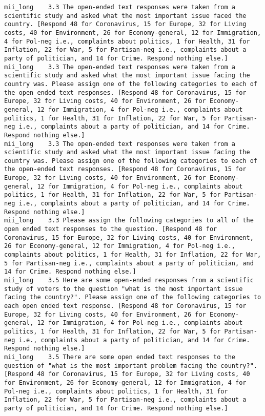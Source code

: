 \begin{lstlisting}[label=lst:promptvariants]
mii_long	3.3	The open-ended text responses were taken from a scientific study and asked what the most important issue faced the country. [Respond 48 for Coronavirus, 15 for Europe, 32 for Living costs, 40 for Environment, 26 for Economy-general, 12 for Immigration, 4 for Pol-neg i.e., complaints about politics, 1 for Health, 31 for Inflation, 22 for War, 5 for Partisan-neg i.e., complaints about a party of politician, and 14 for Crime. Respond nothing else.]
mii_long	3.3	The open-ended text responses were taken from a scientific study and asked what the most important issue facing the country was. Please assign one of the following categories to each of the open ended text responses. [Respond 48 for Coronavirus, 15 for Europe, 32 for Living costs, 40 for Environment, 26 for Economy-general, 12 for Immigration, 4 for Pol-neg i.e., complaints about politics, 1 for Health, 31 for Inflation, 22 for War, 5 for Partisan-neg i.e., complaints about a party of politician, and 14 for Crime. Respond nothing else.]
mii_long	3.3	The open-ended text responses were taken from a scientific study and asked what the most important issue facing the country was. Please assign one of the following categories to each of the open-ended text responses. [Respond 48 for Coronavirus, 15 for Europe, 32 for Living costs, 40 for Environment, 26 for Economy-general, 12 for Immigration, 4 for Pol-neg i.e., complaints about politics, 1 for Health, 31 for Inflation, 22 for War, 5 for Partisan-neg i.e., complaints about a party of politician, and 14 for Crime. Respond nothing else.]
mii_long	3.3	Please assign the following categories to all of the open ended text responses to the question. [Respond 48 for Coronavirus, 15 for Europe, 32 for Living costs, 40 for Environment, 26 for Economy-general, 12 for Immigration, 4 for Pol-neg i.e., complaints about politics, 1 for Health, 31 for Inflation, 22 for War, 5 for Partisan-neg i.e., complaints about a party of politician, and 14 for Crime. Respond nothing else.]
mii_long	3.5	Here are some open-ended responses from a scientific study of voters to the question "what is the most important issue facing the country?". Please assign one of the following categories to each open ended text response. [Respond 48 for Coronavirus, 15 for Europe, 32 for Living costs, 40 for Environment, 26 for Economy-general, 12 for Immigration, 4 for Pol-neg i.e., complaints about politics, 1 for Health, 31 for Inflation, 22 for War, 5 for Partisan-neg i.e., complaints about a party of politician, and 14 for Crime. Respond nothing else.]
mii_long	3.5	There are some open ended text responses to the question of "what is the most important problem facing the country?". [Respond 48 for Coronavirus, 15 for Europe, 32 for Living costs, 40 for Environment, 26 for Economy-general, 12 for Immigration, 4 for Pol-neg i.e., complaints about politics, 1 for Health, 31 for Inflation, 22 for War, 5 for Partisan-neg i.e., complaints about a party of politician, and 14 for Crime. Respond nothing else.]

\end{lstlisting}

